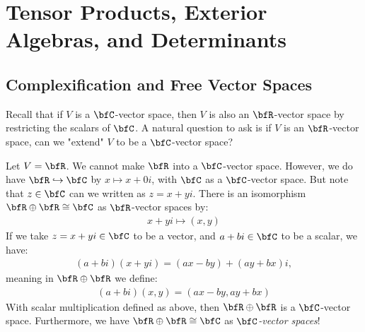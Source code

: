 \chapter{Tensor Products, Exterior Algebras, and Determinants}
\vspace{12pt}

\section{Complexification and Free Vector Spaces}
    Recall that if $V$ is a $\bfC$-vector space, then $V$ is also an $\bfR$-vector space by restricting the scalars of $\bfC$. A natural question to ask is if $V$ is an $\bfR$-vector space, can we "extend" $V$ to be a $\bfC$-vector space?

    \begin{example}
        Let $V = \bfR$. We cannot make $\bfR$ into a $\bfC$-vector space. However, we do have $\bfR \hookrightarrow \bfC$ by $x \mapsto x + 0i$, with $\bfC$ as a $\bfC$-vector space. But note that $z \in \bfC$ can we written as $z = x+yi$. There is an isomorphism $\bfR \oplus \bfR \cong \bfC$ as $\bfR$-vector spaces by:
            \begin{equation*}
            \begin{split}
                x+yi \mapsto (x,y)
            \end{split}
            \end{equation*}
        If we take $z = x+yi \in \bfC$ to be a vector, and $a+bi \in \bfC$ to be a scalar, we have:
            \begin{equation*}
            \begin{split}
                (a+bi)(x+yi) = (ax-by)+(ay+bx)i,
            \end{split}
            \end{equation*}
        meaning in $\bfR \oplus \bfR$ we define:
            \begin{equation*}
            \begin{split}
                (a+bi)(x,y) = (ax-by,ay+bx)
            \end{split}
            \end{equation*}
        With scalar multiplication defined as above, then $\bfR \oplus \bfR$ is a $\bfC$-vector space. Furthermore, we have $\bfR \oplus \bfR \cong \bfC$ as \textit{$\bfC$-vector spaces}!
    \end{example}

